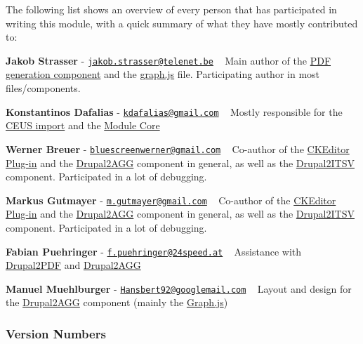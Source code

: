 The following list shows an overview of every person that has participated in writing this module, with a quick summary of what they have mostly contributed to\+:
\begin{DoxyItemize}
\item {\bfseries Jakob Strasser} -\/ \href{mailto:jakob.strasser@telenet.be}{\tt jakob.\+strasser@telenet.\+be} ~\newline
Main author of the \hyperlink{index_CEUS2Drupal}{P\+D\+F generation component} and the \hyperlink{graph_8js}{graph.\+js} file. Participating author in most files/components. 


\item {\bfseries Konstantinos Dafalias} -\/ \href{mailto:kdafalias@gmail.com}{\tt kdafalias@gmail.\+com} ~\newline
Mostly responsible for the \hyperlink{index_CEUS2Drupal}{C\+E\+U\+S import} and the \hyperlink{group___stukowin___module}{Module Core} 


\item {\bfseries Werner Breuer} -\/ \href{mailto:bluescreenwerner@gmail.com}{\tt bluescreenwerner@gmail.\+com} ~\newline
Co-\/author of the \hyperlink{index_plugin}{C\+K\+Editor Plug-\/in} and the \hyperlink{index_Drupal2AGG}{Drupal2\+A\+G\+G} component in general, as well as the \hyperlink{index_Drupal2ITSV}{Drupal2\+I\+T\+S\+V} component. Participated in a lot of debugging. 


\item {\bfseries Markus Gutmayer} -\/ \href{mailto:m.gutmayer@gmail.com}{\tt m.\+gutmayer@gmail.\+com} ~\newline
Co-\/author of the \hyperlink{index_plugin}{C\+K\+Editor Plug-\/in} and the \hyperlink{index_Drupal2AGG}{Drupal2\+A\+G\+G} component in general, as well as the \hyperlink{index_Drupal2ITSV}{Drupal2\+I\+T\+S\+V} component. Participated in a lot of debugging. 


\item {\bfseries Fabian Puehringer} -\/ \href{mailto:f.puehringer@24speed.at}{\tt f.\+puehringer@24speed.\+at} ~\newline
Assistance with \hyperlink{index_Drupal2PDF}{Drupal2\+P\+D\+F} and \hyperlink{index_Drupal2AGG}{Drupal2\+A\+G\+G} 


\item {\bfseries Manuel Muehlburger} -\/ \href{mailto:Hansbert92@googlemail.com}{\tt Hansbert92@googlemail.\+com} ~\newline
Layout and design for the \hyperlink{index_Drupal2AGG}{Drupal2\+A\+G\+G} component (mainly the \hyperlink{index_graph}{Graph.\+js})
\end{DoxyItemize}\hypertarget{index_versionnumbers}{}\subsubsection{Version Numbers}\label{index_versionnumbers}
